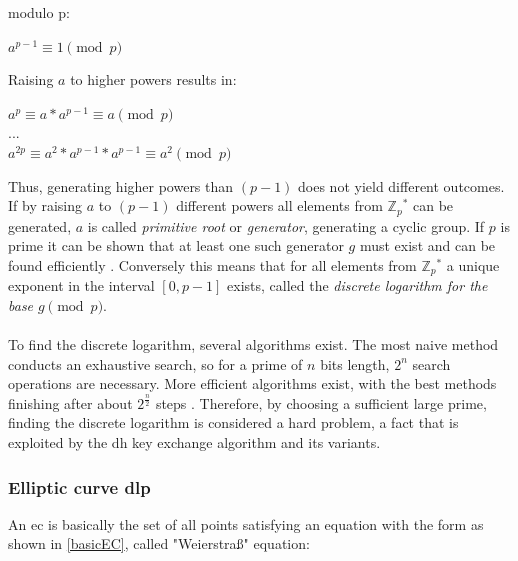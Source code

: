 modulo p:
\begin{center}
 $a^{p-1} \equiv 1 \pmod p $ \\
\end{center}
Raising $a$ to higher powers results in:
\begin{center}
 $a^{p} \equiv a*a^{p-1} \equiv a \pmod p$ \\
 $...$ \\
 $a^{2p} \equiv a^2 * a^{p-1} * a^{p-1} \equiv a^2 \pmod p$
\end{center}
Thus, generating higher powers than $(p-1)$ does not yield different outcomes. If by raising $a$ to $(p-1)$ different powers all elements from $\mathbb{Z}{_p}^*$ can
be generated, $a$ is called \textit{primitive root} or \textit{generator}, generating a cyclic group.
If $p$ is prime it can be shown that at least one such generator $g$ must exist and can be found efficiently \cite{primitiveRoot}.
Conversely this means that for all elements from  $\mathbb{Z}{_p}^*$ a unique exponent in the interval $[0, p-1]$ exists,
called the \textit{discrete logarithm for the base $ g \pmod p$}.
\\
\\
To find
the discrete logarithm, several algorithms exist. The most naive method conducts an exhaustive search, so for a prime of $n$ bits length, $2^n$ search operations
are necessary. More efficient algorithms exist, with the best methods finishing after about $2^{\frac{n}{2}}$ steps \cite{5199978}. 
Therefore, by choosing a sufficient large prime, finding the discrete logarithm is considered a hard problem, a fact
that is exploited by the \gls{dh} key exchange algorithm and its variants.

\subsubsection{Elliptic curve \gls{dlp}}
An \gls{ec} is basically the set of all points
satisfying an equation with the form as shown in \ref{basicEC}, called "Weierstraß" equation:

